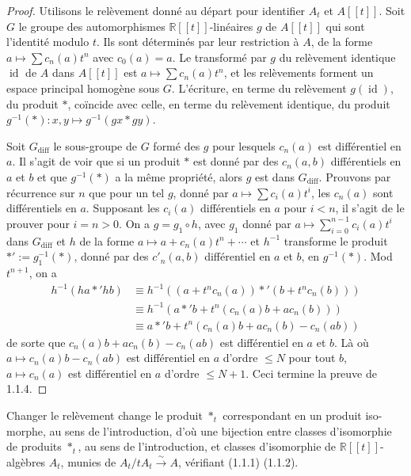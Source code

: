 \documentclass[11pt,a4paper]{article}
\theoremstyle{plain}
\theoremstyle{definition}
\DeclareMathOperator{\id}{id}
\newcommand{\R}{\mathbb{R}}
\newcommand{\iso}{\xrightarrow{\sim}}
\begin{document}
\begin{proof}
Utilisons le rel\`evement donn\'e au d\'epart pour identifier $A_{t}$ et $A[[t]]$. Soit $G$
le groupe des automorphismes $\R[[t]]$-lin\'eaires $g$ de $A[[t]]$ qui sont l'identit\'e modulo
$t$. Ils sont d\'etermin\'es par leur restriction \`a $A$, de la forme $a \mapsto \sum c_{n}(a)t^{n}$ avec
$c_{0}(a) = a$. Le transform\'e par $g$ du rel\`evement identique $\id$ de $A$ dans $A[[t]]$ est
$a \mapsto \sum c_{n}(a)t^{n}$, et les rel\`evements forment un espace principal homog\`ene sous $G$.
L'\'ecriture, en terme du rel\`evement $g(\id)$, du produit $*$, co\"incide avec celle, en terme
du rel\`evement identique, du produit $g^{-1}(*): x, y \mapsto g^{-1}(g x * g y)$.

Soit $G_{\text{diff}}$ le sous-groupe de $G$ form\'e des $g$ pour lesquels $c_{n}(a)$ est diff\'erentiel en
$a$. Il s'agit de voir que si un produit $*$ est donn\'e par des $c_{n}(a, b)$ diff\'erentiels en $a$ et
$b$ et que $g^{-1}(*)$ a la m\^eme propri\'et\'e, alors $g$ est dans $G_{\text{diff}}$. Prouvons par r\'ecurrence
sur $n$ que pour un tel $g$, donn\'e par $a \mapsto \sum c_{i}(a)t^{i}$, les $c_{n}(a)$ sont diff\'erentiels en
$a$. Supposant les $c_{i}(a)$ diff\'erentiels en $a$ pour $i < n$, il s'agit de le prouver pour
$i = n > 0$. On a $g = g_{1} \circ h$, avec $g_{1}$ donn\'e par $a \mapsto \sum_{i=0}^{n-1} c_{i}(a)t^{i}$ dans $G_{\text{diff}}$ et $h$ de
la forme $a \mapsto a + c_{n}(a)t^{n} + \cdots$ et $h^{-1}$ transforme le produit $*' := g_{1}^{-1}(*)$, donn\'e
par des $c'_{n}(a, b)$ diff\'erentiel en $a$ et $b$, en $g^{-1}(*)$. Mod $t^{n+1}$, on a
\begin{align*}
h^{-1}(h a *' h b) &\equiv h^{-1}((a + t^{n}c_{n}(a)) *' (b + t^{n}c_{n}(b))) \\
&\equiv h^{-1}(a *' b + t^{n}(c_{n}(a)b + a c_{n}(b))) \\
&\equiv a *' b + t^{n}(c_{n}(a)b + a c_{n}(b) - c_{n}(ab))
\end{align*}
de sorte que $c_{n}(a)b + a c_{n}(b) - c_{n}(ab)$ est diff\'erentiel en $a$ et $b$. L\`a o\`u
$a \mapsto c_{n}(a)b - c_{n}(ab)$ est diff\'erentiel en $a$ d'ordre $\leq N$ pour tout $b$,
$a \mapsto c_{n}(a)$ est diff\'erentiel en $a$ d'ordre $\leq N+1$. Ceci termine la preuve de 1.1.4.
\end{proof}

Changer le rel\`evement change le produit $*_{t}$ correspondant en un produit iso-
morphe, au sens de l'introduction, d'o\`u une bijection entre classes d'isomorphie de
produits $*_{t}$, au sens de l'introduction, et classes d'isomorphie de $\R[[t]]$-alg\`ebres $A_{t}$,
munies de $A_{t}/tA_{t} \iso A$, v\'erifiant (1.1.1) (1.1.2).
\end{document}
